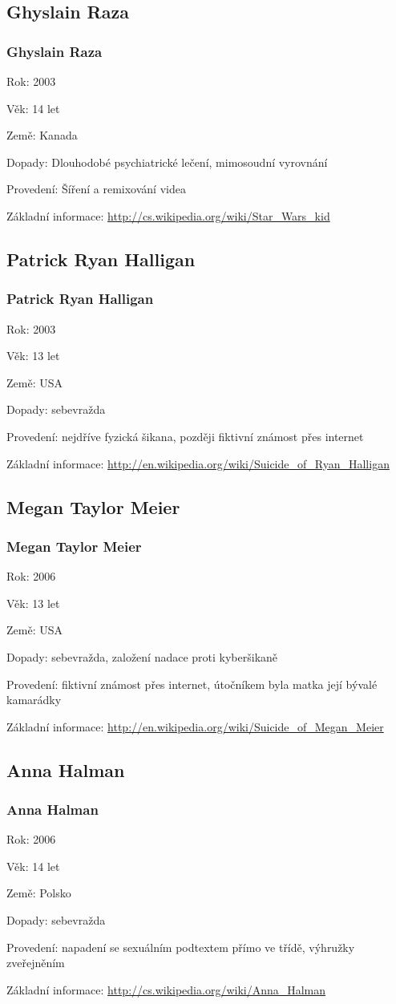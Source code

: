 \documentclass[xetex]{beamer}
\begin{document}
\subsection{Ghyslain Raza}
\begin{frame}
  \frametitle{Ghyslain Raza}

	Rok: 2003
	
	Věk: 14 let

	Země: Kanada

	Dopady: Dlouhodobé psychiatrické lečení, mimosoudní vyrovnání

	Provedení: Šíření a remixování videa

	Základní informace: \url{http://cs.wikipedia.org/wiki/Star\_Wars\_kid}
\end{frame}

\subsection{Patrick Ryan Halligan}
\begin{frame}
	\frametitle{Patrick Ryan Halligan}
	
	Rok: 2003

	Věk: 13 let

	Země: USA

	Dopady: sebevražda

	Provedení: nejdříve fyzická šikana, později fiktivní známost přes internet

	Základní informace: \url{http://en.wikipedia.org/wiki/Suicide\_of\_Ryan\_Halligan}
\end{frame}

\subsection{Megan Taylor Meier}
\begin{frame}
	\frametitle{Megan Taylor Meier}

	Rok: 2006

	Věk: 13 let

	Země: USA

	Dopady: sebevražda, založení nadace proti kyberšikaně
	
	Provedení: fiktivní známost přes internet, útočníkem byla matka její bývalé kamarádky

	Základní informace: \url{http://en.wikipedia.org/wiki/Suicide\_of\_Megan\_Meier}
\end{frame}

\subsection{Anna Halman}
\begin{frame}
  \frametitle{Anna Halman}

  Rok: 2006

	Věk: 14 let

	Země: Polsko

	Dopady: sebevražda

	Provedení: napadení se sexuálním podtextem přímo ve třídě, výhružky zveřejněním
	
	Základní informace: \url{http://cs.wikipedia.org/wiki/Anna_Halman}
\end{frame}
\end{document}
